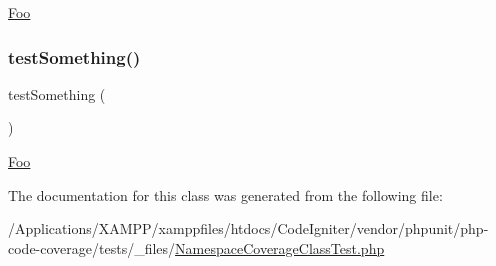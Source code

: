 \mbox{\hyperlink{class_foo}{Foo}} \mbox{\label{class_namespace_coverage_class_test_a0fc4e17369bc9607ebdd850d9eda8167}} 
\subsubsection{\texorpdfstring{test\+Something()}{testSomething()}\hspace{0.1cm}{\footnotesize\ttfamily [2/2]}}
{\footnotesize\ttfamily test\+Something (\begin{DoxyParamCaption}{ }\end{DoxyParamCaption})}

\mbox{\hyperlink{class_foo}{Foo}} 

The documentation for this class was generated from the following file\+:\begin{DoxyCompactItemize}
\item 
/\+Applications/\+X\+A\+M\+P\+P/xamppfiles/htdocs/\+Code\+Igniter/vendor/phpunit/php-\/code-\/coverage/tests/\+\_\+files/\mbox{\hyperlink{php-code-coverage_2tests_2__files_2_namespace_coverage_class_test_8php}{Namespace\+Coverage\+Class\+Test.\+php}}\end{DoxyCompactItemize}
